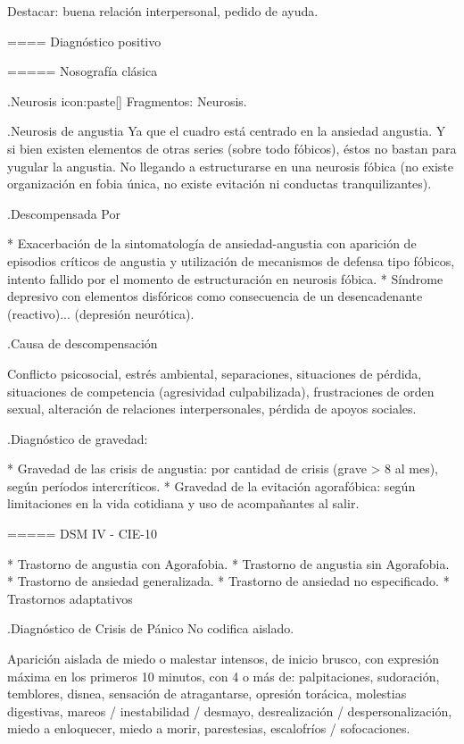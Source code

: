 \documentclass{scrbook}
\begin{document}
Destacar: buena relación interpersonal, pedido de ayuda.

==== Diagnóstico positivo

===== Nosografía clásica

.Neurosis
icon:paste[] Fragmentos: Neurosis.

.Neurosis de angustia
Ya que el cuadro está centrado en la ansiedad angustia. Y si bien existen elementos de otras series (sobre todo fóbicos), éstos no bastan para yugular la angustia. No llegando a estructurarse en una neurosis fóbica (no existe organización en fobia única, no existe evitación ni conductas tranquilizantes).

.Descompensada
Por

* Exacerbación de la sintomatología de ansiedad-angustia con aparición de episodios críticos de angustia y utilización de mecanismos de defensa tipo fóbicos, intento fallido por el momento de estructuración en neurosis fóbica.
* Síndrome depresivo con elementos disfóricos como consecuencia de un desencadenante (reactivo)... (depresión neurótica).

.Causa de descompensación

Conflicto psicosocial, estrés ambiental, separaciones, situaciones de pérdida, situaciones de competencia (agresividad culpabilizada), frustraciones de orden sexual, alteración de relaciones interpersonales, pérdida de apoyos sociales.

.Diagnóstico de gravedad:

* Gravedad de las crisis de angustia: por cantidad de crisis (grave > 8 al mes), según períodos intercríticos.
* Gravedad de la evitación agorafóbica: según limitaciones en la vida cotidiana y uso de acompañantes al salir.

===== DSM IV - CIE-10

* Trastorno de angustia con Agorafobia.
* Trastorno de angustia sin Agorafobia.
* Trastorno de ansiedad generalizada.
* Trastorno de ansiedad no especificado.
* Trastornos adaptativos

.Diagnóstico de Crisis de Pánico
No codifica aislado.

Aparición aislada de miedo o malestar intensos, de inicio brusco, con expresión máxima en los primeros 10 minutos, con 4 o más de: palpitaciones, sudoración, temblores, disnea, sensación de atragantarse, opresión torácica, molestias digestivas, mareos / inestabilidad / desmayo, desrealización / despersonalización, miedo a enloquecer, miedo a morir, parestesias, escalofríos / sofocaciones.
\end{document}
